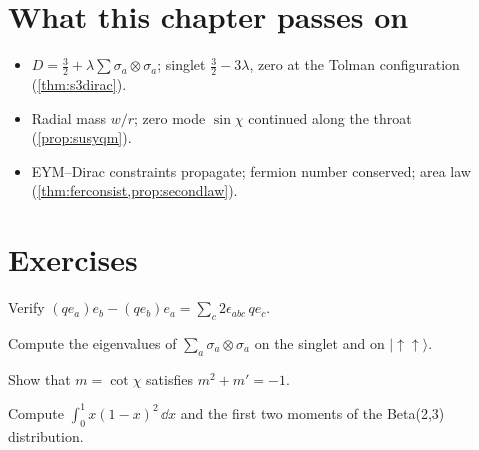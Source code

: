 \section*{What this chapter passes on}
\begin{itemize}[nosep]
\item $D=\frac32+\lambda\sum\sigma_a\otimes\sigma_a$; singlet $\frac32-3\lambda$, zero at the Tolman configuration (\cref{thm:s3dirac}).
\item Radial mass $w/r$; zero mode $\sin\chi$ continued along the throat (\cref{prop:susyqm}).
\item EYM--Dirac constraints propagate; fermion number conserved; area law (\cref{thm:ferconsist,prop:secondlaw}).
\end{itemize}

\section*{Exercises}
\begin{exercise}
Verify $(qe_a)e_b-(qe_b)e_a=\sum_c2\epsilon_{abc}\,qe_c$.
\end{exercise}
\begin{exercise}
Compute the eigenvalues of $\sum_a\sigma_a\otimes\sigma_a$ on the singlet and on $|{\uparrow\uparrow}\rangle$.
\end{exercise}
\begin{exercise}
Show that $m=\cot\chi$ satisfies $m^2+m'=-1$.
\end{exercise}
\begin{exercise}
Compute $\int_0^1x(1-x)^2\,\dd x$ and the first two moments of the Beta(2,3) distribution.
\end{exercise}

